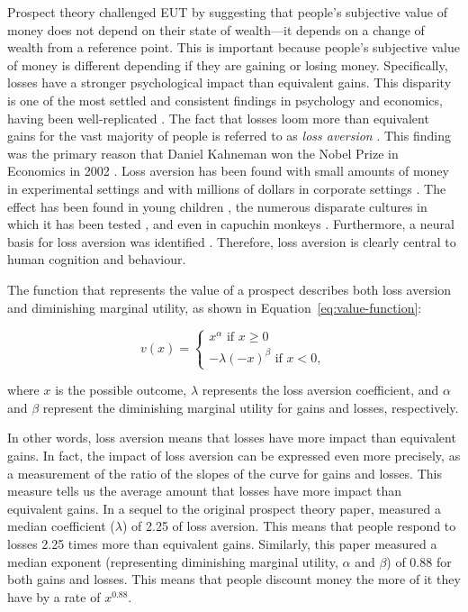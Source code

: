 \documentclass[a4paper, nobind]{templates/ociamthesis}
\theoremstyle{definition}
\theoremstyle{definition}
\theoremstyle{definition}
\theoremstyle{definition}
\theoremstyle{remark}
\begin{document}
Prospect theory \autocite{kahneman1979,tversky1992} challenged EUT by suggesting that
people's subjective value of money does not depend on their state of wealth---it
depends on a change of wealth from a reference point. This is important because
people's subjective value of money is different depending if they are gaining or
losing money. Specifically, losses have a stronger psychological impact than
equivalent gains. This disparity is one of the most settled and consistent
findings in psychology and economics, having been well-replicated \autocite[e.g,][]{ruggeri2020}. The fact that losses loom more than equivalent gains for the vast
majority of people is referred to as \emph{loss aversion} \autocite{kahneman1979}. This
finding was the primary reason that Daniel Kahneman won the Nobel Prize in
Economics in 2002 \autocite{kahneman2003}. Loss aversion has been found with small
amounts of money in experimental settings \autocite{kahneman1979,tversky1992} and with
millions of dollars in corporate settings \autocite{koller2012,swalm1966}. The effect
has been found in young children \autocite{harbaugh2001}, the numerous disparate
cultures in which it has been tested \autocite{weber1998}, and even in capuchin monkeys
\autocite{chen2006a}. Furthermore, a neural basis for loss aversion was identified
\autocite{tom2007}. Therefore, loss aversion is clearly central to human cognition and
behaviour.

The function that represents the value of a prospect describes both loss
aversion and diminishing marginal utility, as shown in
Equation~\eqref{eq:value-function}:

\begin{equation} v(x) = \left\{ \begin{array}{l} x^\alpha \text{ if } x \ge 0 \\
-\lambda(-x)^\beta \text{ if } x < 0, \label{eq:value-function} \end{array} \right.
\end{equation}

where \(x\) is the possible outcome, \(\lambda\) represents the loss aversion
coefficient, and \(\alpha\) and \(\beta\) represent the diminishing marginal utility
for gains and losses, respectively.

In other words, loss aversion means that losses have more impact than equivalent
gains. In fact, the impact of loss aversion can be expressed even more
precisely, as a measurement of the ratio of the slopes of the curve for gains
and losses. This measure tells us the average amount that losses have more
impact than equivalent gains. In a sequel to the original prospect theory paper,
\textcite{tversky1992} measured a median coefficient (\(\lambda\)) of 2.25 of loss aversion.
This means that people respond to losses 2.25 times more than equivalent gains.
Similarly, this paper measured a median exponent (representing diminishing
marginal utility, \(\alpha\) and \(\beta\)) of 0.88 for both gains and losses. This
means that people discount money the more of it they have by a rate of
\(x^{0.88}\).
\end{document}
